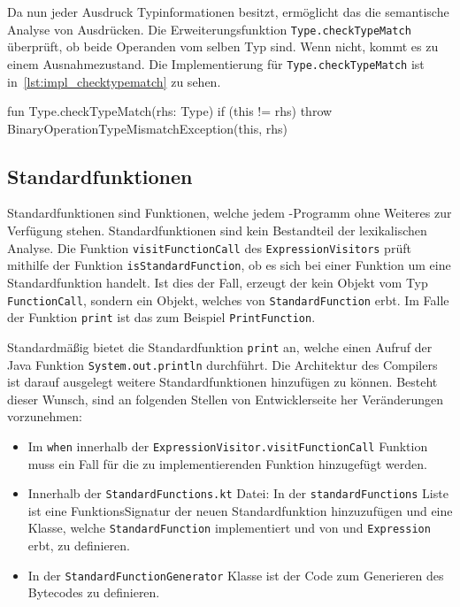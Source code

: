 Da nun jeder Ausdruck Typinformationen besitzt, ermöglicht das die semantische Analyse von Ausdrücken. Die Erweiterungsfunktion \texttt{Type.checkTypeMatch} überprüft, ob beide Operanden vom selben Typ sind. Wenn nicht, kommt es zu einem Ausnahmezustand. Die Implementierung für \texttt{Type.checkTypeMatch} ist in~\autoref{lst:impl_checktypematch} zu sehen.

\begin{KotlinCode}[numbers=none, caption={Methode zur Überprüfung von übereinstimmende Typen zweier Operanden}, label=lst:impl_checktypematch]
fun Type.checkTypeMatch(rhs: Type) {
    if (this != rhs) throw BinaryOperationTypeMismatchException(this, rhs)
}    
\end{KotlinCode}

\subsection{Standardfunktionen}

Standardfunktionen sind Funktionen, welche jedem \toya-Programm ohne Weiteres zur Verfügung stehen. Standardfunktionen sind kein Bestandteil der lexikalischen Analyse. Die Funktion \texttt{visitFunctionCall} des \texttt{ExpressionVisitors} prüft mithilfe der Funktion \texttt{isStandardFunction}, ob es sich bei einer Funktion um eine Standardfunktion handelt. Ist dies der Fall, erzeugt der \visitor kein Objekt vom Typ \texttt{FunctionCall}, sondern ein Objekt, welches von \texttt{StandardFunction} erbt. Im Falle der Funktion \texttt{print} ist das zum Beispiel \texttt{PrintFunction}.

Standardmäßig bietet \toya die Standardfunktion \texttt{print} an, welche einen Aufruf der Java Funktion \texttt{System.out.println} durchführt. Die Architektur des \toya Compilers ist darauf ausgelegt weitere Standardfunktionen hinzufügen zu können. Besteht dieser Wunsch, sind an folgenden Stellen von Entwicklerseite her Veränderungen vorzunehmen:

\begin{itemize}
    \item Im \texttt{when} innerhalb der \texttt{ExpressionVisitor.visitFunctionCall} Funktion muss ein Fall für die zu implementierenden Funktion hinzugefügt werden.
    \item Innerhalb der \texttt{StandardFunctions.kt} Datei: In der \texttt{standardFunctions} Liste ist eine FunktionsSignatur der neuen Standardfunktion hinzuzufügen und eine Klasse, welche \texttt{StandardFunction} implementiert und von und \texttt{Expression} erbt, zu definieren.
    \item In der \texttt{StandardFunctionGenerator} Klasse ist der Code zum Generieren des Bytecodes zu definieren.
\end{itemize}

